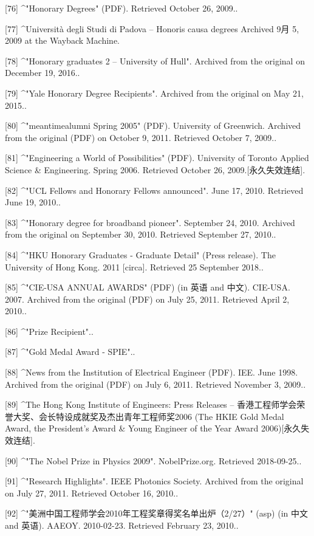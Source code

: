 [76]
^"Honorary Degrees" (PDF). Retrieved October 26, 2009..

[77]
^Università degli Studi di Padova – Honoris causa degrees Archived 9月 5, 2009 at the Wayback Machine.

[78]
^"Honorary graduates 2 – University of Hull". Archived from the original on December 19, 2016..

[79]
^"Yale Honorary Degree Recipients". Archived from the original on May 21, 2015..

[80]
^"meantimealumni Spring 2005" (PDF). University of Greenwich. Archived from the original (PDF) on October 9, 2011. Retrieved October 7, 2009..

[81]
^"Engineering a World of Possibilities" (PDF). University of Toronto Applied Science & Engineering. Spring 2006. Retrieved October 26, 2009.[永久失效连结].

[82]
^"UCL Fellows and Honorary Fellows announced". June 17, 2010. Retrieved June 19, 2010..

[83]
^"Honorary degree for broadband pioneer". September 24, 2010. Archived from the original on September 30, 2010. Retrieved September 27, 2010..

[84]
^"HKU Honorary Graduates - Graduate Detail" (Press release). The University of Hong Kong. 2011 [circa]. Retrieved 25 September 2018..

[85]
^"CIE-USA ANNUAL AWARDS" (PDF) (in 英语 and 中文). CIE-USA. 2007. Archived from the original (PDF) on July 25, 2011. Retrieved April 2, 2010..

[86]
^"Prize Recipient"..

[87]
^"Gold Medal Award - SPIE"..

[88]
^News from the Institution of Electrical Engineer (PDF). IEE. June 1998. Archived from the original (PDF) on July 6, 2011. Retrieved November 3, 2009..

[89]
^The Hong Kong Institute of Engineers: Press Releases – 香港工程师学会荣誉大奖、会长特设成就奖及杰出青年工程师奖2006 (The HKIE Gold Medal Award, the President's Award & Young Engineer of the Year Award 2006)[永久失效连结].

[90]
^"The Nobel Prize in Physics 2009". NobelPrize.org. Retrieved 2018-09-25..

[91]
^"Research Highlights". IEEE Photonics Society. Archived from the original on July 27, 2011. Retrieved October 16, 2010..

[92]
^"美洲中国工程师学会2010年工程奖章得奖名单出炉（2/27）" (asp) (in 中文 and 英语). AAEOY. 2010-02-23. Retrieved February 23, 2010..

